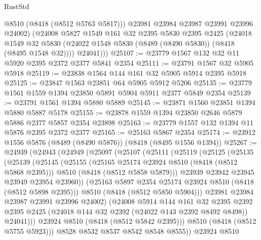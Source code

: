 \begin{lexlean}{RustStd}
\begin{coremodule}
            @8510
            (@8418 (@8512 @5763 @5817)))
          @23981
          @23984
          @23987
          @23991
          @23996
          @24002)
        (@24008
          @5827
          @1549
          @161
          @32
          @2395
          @5830
          @2395
          @2425
          (@24018
            @1549
            @32
            @5830
            (@24022 @1548 @5830 (@8489 (@8490 @5830)) (@8418 (@8495 @1548 @32))))
          @24041)))
@25107 := @23779 @1567 @132 @32 @11 @5920 @2395 @2372 @2377 @5841 @2354
@25111 := @23791 @1567 @32 @5905 @5918
@25119 := @23838 @1564 @144 @161 @32 @5905 @5914 @2395 @5918
@25125 := @23847 @1563 @23851 @64 @5905 @5912 @5206
@25135 := @23779 @1561 @1559 @1394 @23850 @5891 @5904 @5911 @2377 @5849 @2354
@25139 := @23791 @1561 @1394 @5880 @5889
@25145 := @23871 @1560 @23851 @1394 @5880 @5887 @5178
@25155 := @23878 @1559 @1394 @23850 @2646 @5879 @5886 @2377 @5857 @2354 @23898
@25163 := @23779 @1557 @132 @1394 @11 @5876 @2395 @2372 @2377
@25165 := @25163 @5867 @2354
@25174 := @23912 @1556 @5876 (@8489 (@8490 @5876)) (@8418 (@8495 @1556 @1394))
@25267 := @24939
    (@24943
      (@24949
        (@25097
          (@25107
            (@25111
              (@25119
                (@25125
                  (@25135
                    (@25139
                      (@25145
                        (@25155
                          (@25165 @25174 @23924 @8510 (@8418 (@8512 @5868 @2395)))
                          @8510
                          (@8418 (@8512 @5858 @5879)))
                        @23939
                        @23942
                        @23945
                        @23949
                        @23954
                        @23960))
                    (@25163 @5897 @2354 @25174 @23924 @8510 (@8418 (@8512 @5898 @2395)))
                    @8510
                    (@8418 (@8512 @5850 @5904)))
                  @23981
                  @23984
                  @23987
                  @23991
                  @23996
                  @24002)
                (@24008
                  @5914
                  @144
                  @161
                  @32
                  @2395
                  @2392
                  @2395
                  @2425
                  (@24018 @144 @32 @2392 (@24022 @143 @2392 @8492 @8498))
                  @24041)))
            @23924
            @8510
            (@8418 (@8512 @5842 @2395)))
          @8510
          (@8418 (@8512 @5755 @5923)))
        @8528
        @8532
        @8537
        @8542
        @8548
        @8555))
    @23924
    @8510

\end{coremodule}
\end{lexlean}
